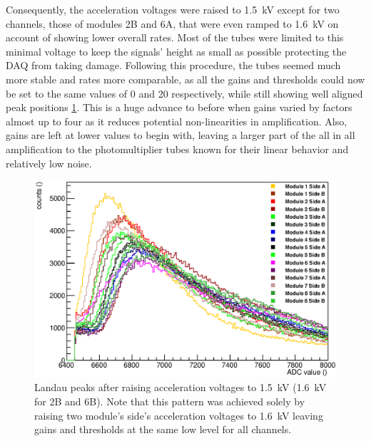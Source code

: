 	Consequently, the acceleration voltages were raised to \SI{1.5}{\kilo\volt} except for two channels, those of modules 2B and 6A, that were even ramped to \SI{1.6}{\kilo\volt} on account of showing lower overall rates.
	Most of the tubes were limited to this minimal voltage to keep the signals' height as small as possible protecting the DAQ from taking damage. Following this procedure, the tubes seemed much more stable and rates more comparable, as all the gains and thresholds could now be set to the same values of \SI{0}{}  and \SI{20}{} respectively, while still showing well aligned peak positions \ref{fig:allPeaksAfter}. This is a huge advance to before when gains varied by factors almost up to four as it reduces potential non-linearities in amplification. Also, gains are left at lower values to begin with, leaving a larger part of the all in all amplification to the photomultiplier tubes known for their linear behavior and relatively low noise.
  
	\begin{figure}
		\centering
		\includegraphics[width = 0.9 \textwidth]{graphics/setup/LandauPeaksRun1097_new.eps}
		\caption[Landau peak \SI{1500}{\volt} acceleration voltage]{Landau peaks after raising acceleration voltages to \SI{1.5}{\kilo\volt} (\SI{1.6}{\kilo\volt} for 2B and 6B). Note that this pattern was achieved solely by raising two module's side's acceleration voltages to \SI{1.6}{\kilo\volt} leaving gains and thresholds at the same low level for all channels. }
		\label{fig:allPeaksAfter}
	\end{figure}
	
	


